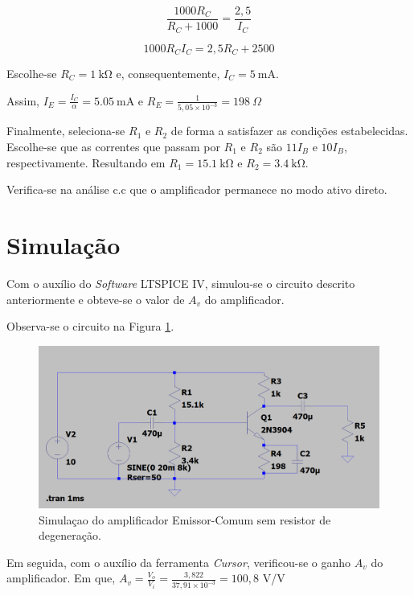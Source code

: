 \documentclass[journal, a4paper]{IEEEtran}
\begin{document}
      $$ \frac{1000R_C}{R_C + 1000} = \frac{2,5}{I_C} $$
      
      $$ 1000 R_C I_C = 2,5R_C + 2500 $$
      
    \tab Escolhe-se $R_C = \SI{1}{\kilo\ohm}$ e, consequentemente, $I_C =\SI{5}{\milli\ampere}$.
    
    \tab Assim, $I_E = \frac{I_C}{\alpha} =\SI{5,05}{\milli\ampere}$ e $R_E  = \frac{1}{5,05 \times 10^{-3}} = 198 \: \Omega$
    
    \tab Finalmente, seleciona-se $R_1$ e $R_2$ de forma a satisfazer as condições estabelecidas. Escolhe-se que as correntes que passam por $R_1$ e $R_2$ são $11 I_B$ e $10 I_B$, respectivamente. Resultando em $R_1 = \SI{15,1}{\kilo\ohm}$ e $R_2 = \SI{3,4}{\kilo\ohm}$.
    
    \tab Verifica-se na análise c.c que o amplificador permanece no modo ativo direto.

\section{Simulação}
    \tab Com o auxílio do \textit{Software} LT{\ssmall SPICE} IV, simulou-se o circuito descrito anteriormente e obteve-se o valor de $A_v$ do amplificador.
    
    \tab Observa-se o circuito na Figura \ref{circuit ideal com distorção}.
         \begin{figure}[H]
    		\begin{center}
    		\includegraphics[width=\columnwidth]{circuito_ideal_distorcao.PNG}
    		\caption{Simulaçao do amplificador Emissor-Comum sem resistor de degeneração.}
    		\label{circuit ideal com distorção}
    		\end{center}
    	\end{figure}
    	
    \tab Em seguida, com o auxílio da ferramenta \textit{Cursor}, verificou-se o ganho $A_v$ do amplificador. Em que, $A_v = \frac{V_o}{V_i} = \frac{3,822}{37,91 \times 10^{-3}} = 100,8$ V/V
    
\end{document}
